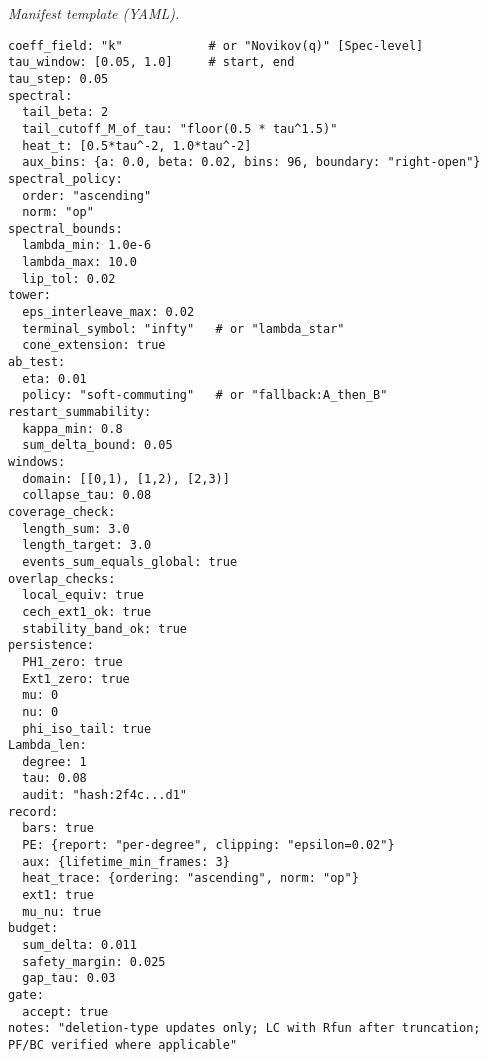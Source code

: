 \documentclass[11pt]{article}
\numberwithin{equation}{section}
\theoremstyle{plain}
\theoremstyle{definition}
\theoremstyle{remark}
\theoremstyle{plain}
\theoremstyle{definition}
\numberwithin{equation}{section}
\theoremstyle{definition}
\numberwithin{equation}{section}
\theoremstyle{plain}
\theoremstyle{definition}
\theoremstyle{remark}
\begin{document}
\noindent\emph{Manifest template (YAML).}
\small
\begin{verbatim}
coeff_field: "k"            # or "Novikov(q)" [Spec-level]
tau_window: [0.05, 1.0]     # start, end
tau_step: 0.05
spectral:
  tail_beta: 2
  tail_cutoff_M_of_tau: "floor(0.5 * tau^1.5)"
  heat_t: [0.5*tau^-2, 1.0*tau^-2]
  aux_bins: {a: 0.0, beta: 0.02, bins: 96, boundary: "right-open"}
spectral_policy:
  order: "ascending"
  norm: "op"
spectral_bounds:
  lambda_min: 1.0e-6
  lambda_max: 10.0
  lip_tol: 0.02
tower:
  eps_interleave_max: 0.02
  terminal_symbol: "infty"   # or "lambda_star"
  cone_extension: true
ab_test:
  eta: 0.01
  policy: "soft-commuting"   # or "fallback:A_then_B"
restart_summability:
  kappa_min: 0.8
  sum_delta_bound: 0.05
windows:
  domain: [[0,1), [1,2), [2,3)]
  collapse_tau: 0.08
coverage_check:
  length_sum: 3.0
  length_target: 3.0
  events_sum_equals_global: true
overlap_checks:
  local_equiv: true
  cech_ext1_ok: true
  stability_band_ok: true
persistence:
  PH1_zero: true
  Ext1_zero: true
  mu: 0
  nu: 0
  phi_iso_tail: true
Lambda_len:
  degree: 1
  tau: 0.08
  audit: "hash:2f4c...d1"
record:
  bars: true
  PE: {report: "per-degree", clipping: "epsilon=0.02"}
  aux: {lifetime_min_frames: 3}
  heat_trace: {ordering: "ascending", norm: "op"}
  ext1: true
  mu_nu: true
budget:
  sum_delta: 0.011
  safety_margin: 0.025
  gap_tau: 0.03
gate:
  accept: true
notes: "deletion-type updates only; LC with Rfun after truncation; PF/BC verified where applicable"
\end{verbatim}
\normalsize
\end{document}

